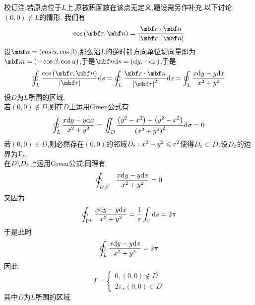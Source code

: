 \documentclass{ctexart}
\begin{document}
\begin{solution}
    校订注:若原点位于$L$上,原被积函数在该点无定义,题设需另作补充.以下讨论$(0,0)\notin L$的情形.
    我们有
    \[\cos\left(\mbf r,\mbf n\right)=\dfrac{\mbf r\cdot\mbf n}{\left|\mbf r\right|\left|\mbf n\right|}\]
    设$\mbf n=(\cos\alpha,\cos\beta)$,那么沿$L$的逆时针方向单位切向量即为$\mbf m=(-\cos\beta,\cos\alpha)$,于是$\mbf n\di s=\left(\di y,-\dx\right)$,于是
    \[\oint_{L}\dfrac{\cos\left(\mbf r,\mbf n\right)}{\left|\mbf r\right|}\di s
    =\oint_{L}\dfrac{\mbf r\cdot\mbf n}{\left|\mbf r\right|^2}\di s
    =\oint_{L}\dfrac{x\di y-y\di x}{x^2+y^2}\]
    设$D$为$L$所围的区域.\\
    若$(0,0)\notin D$,则在$D$上运用Green公式有
    \[\oint_{L}\dfrac{x\mathrm{d} y-y\mathrm{d} x}{x^2+y^2}=\iint_D\dfrac{\left(y^2-x^2\right)-\left(y^2-x^2\right)}{\left(x^2+y^2\right)^2}\mathrm{d}\sigma=0\]
    若$(0,0)\in D$,则必然存在$(0,0)$的邻域$D_\varepsilon:x^2+y^2\leqslant\varepsilon^2$使得$D_\varepsilon\subset D$.设$D_\varepsilon$的边界为$\Gamma_\varepsilon$.\\
    在$D\backslash D_\varepsilon$上运用Green公式,同理有
    \[\oint_{L\cup\Gamma^-}\dfrac{x\mathrm{d} y-y\mathrm{d} x}{x^2+y^2}=0\]
    又因为
    \[\oint_{\Gamma^+}\dfrac{x\mathrm{d} y-y\mathrm{d} x}{x^2+y^2}=\dfrac{1}{\varepsilon}\int_{\Gamma}\mathrm{d} s=2\pi\]
    于是此时
    \[\oint_{L}\dfrac{x\mathrm{d} y-y\mathrm{d} x}{x^2+y^2}=2\pi\]
    因此
    \[I=\left\{\begin{array}{l}
        0,(0,0)\notin D \\
        2\pi,(0,0)\in D
    \end{array}\right.\]
    其中$D$为$L$所围的区域.
\end{solution}
\end{document}
